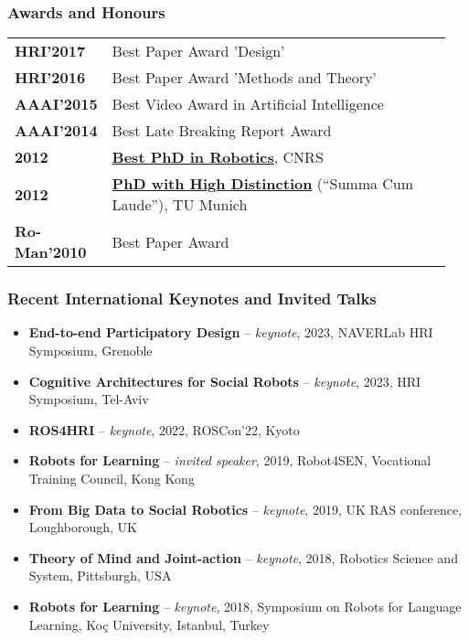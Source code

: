 
\subsubsection{Awards and Honours}

\begin{tabular}{p{0.15\linewidth}p{0.8\linewidth}}
    {\bf HRI'2017} & {Best Paper Award 'Design'} \\
    {\bf HRI'2016} & {Best Paper Award 'Methods and Theory'} \\
    {\bf AAAI'2015} & {Best Video Award in Artificial Intelligence} \\
    {\bf AAAI'2014} & {Best Late Breaking Report Award} \\
    {\bf 2012} & {\underline{\textbf{Best PhD in Robotics}}, CNRS} \\
    {\bf 2012} & {\underline{\textbf{PhD with High Distinction}} (``Summa Cum
	Laude''), TU Munich} \\
    {\bf Ro-Man'2010} & {Best Paper Award} \\
\end{tabular}

\subsubsection{Recent International Keynotes and Invited Talks}

\begin{itemize}
    \item {\textbf{End-to-end Participatory Design} -- \textit{keynote}, 2023,
        NAVERLab HRI Symposium, Grenoble} 
    \item {\textbf{Cognitive Architectures for Social Robots} --
        \textit{keynote}, 2023, HRI Symposium, Tel-Aviv} 
    \item {\textbf{ROS4HRI} -- \textit{keynote}, 2022, ROSCon'22, Kyoto} 
    \item {\textbf{Robots for Learning} -- \textit{invited speaker}, 2019, Robot4SEN,
Vocational Training Council, Kong Kong} 
\item {\textbf{From Big Data to Social Robotics} -- \textit{keynote}, 2019, UK
    RAS conference, Loughborough, UK} 
\item {\textbf{Theory of Mind and Joint-action} -- \textit{keynote}, 2018, Robotics Science and System, Pittsburgh, USA} 
\item {\textbf{Robots for Learning} -- \textit{keynote}, 2018, Symposium on Robots for Language Learning,  Koç University, Istanbul, Turkey} 
\end{itemize}


